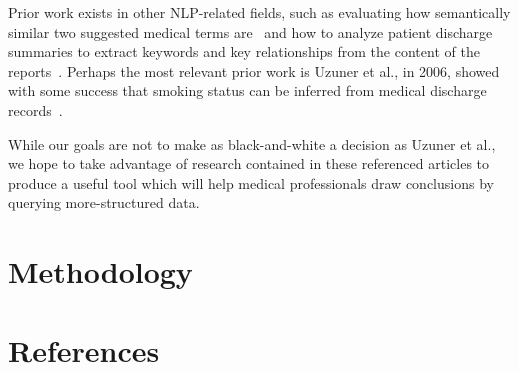 \documentclass{acm_proc_article-sp}
\begin{document}
Prior work exists in other NLP-related fields, such as evaluating how semantically similar 
two suggested medical terms are~\cite{Pedersen2007288} and how to analyze patient
discharge summaries to extract keywords and key relationships from the content of the
reports~\cite{soderland}. Perhaps the most relevant prior work is Uzuner et al., in 2006,
showed with some success that smoking status can be inferred from medical discharge 
records~\cite{Uzuner200814}.

While our goals are not to make as black-and-white a decision as Uzuner et al., we hope to take 
advantage of research contained in these referenced articles to produce a useful tool which will
help medical professionals draw conclusions by querying more-structured data.

\section{Methodology}

\section{References}
{}

\end{document}
